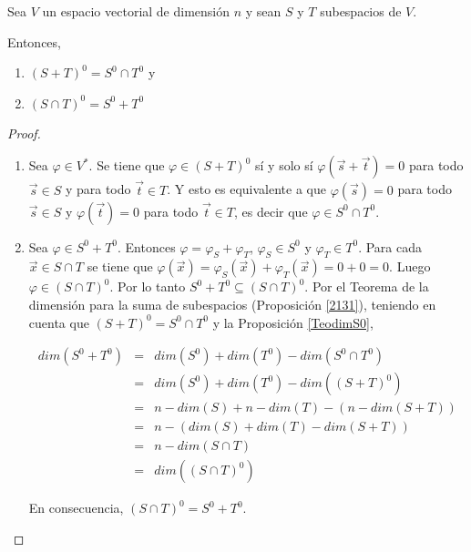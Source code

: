 \bigskip

\begin{theorem} Sea $V$ un espacio vectorial de dimensión $n$ y sean $S$ y $T$  subespacios de $V$. 


Entonces, 

\bigskip

\begin{enumerate}
\item
$(S+T)^0 = S^{0}\cap T^{0}$  y 

\item

$(S\cap T)^{0}=S^{0} +T^{0}$ 
\end{enumerate}
\bigskip

\begin{proof}

\begin{enumerate}
\item
Sea $ \varphi \in V^*$. Se tiene que $ \varphi \in (S+T)^0$ sí y solo sí $ \varphi(\Vec{s} + \Vec{t})=0$ para todo $\Vec{s} \in S$  y   para todo $\Vec{t} \in T$. Y esto es equivalente a que  $\varphi(\Vec{s})=0$ para todo  $\Vec{s} \in S$  y $\varphi(\Vec{t})=0$  para todo $\Vec{t} \in T$, es decir que  $\varphi \in  S^{0}\cap T^{0}$.

\bigskip

\item
Sea $ \varphi \in  S^{0} +T^{0}$. Entonces $ \varphi= \varphi_S + \varphi_T$, $\varphi_S \in  S^{0} $ y $\varphi_T \in  T^{0} $. Para cada $\Vec{x} \in S\cap T $ se tiene que $ \varphi(\Vec{x})=\varphi_S (\Vec{x})+  \varphi_T(\Vec{x})=0+0=0 $. Luego $  \varphi  \in (S\cap T)^{0}$. Por lo tanto $ S^{0} +T^{0}   \subseteq (S\cap T)^{0} $. Por el Teorema de la dimensión para la suma de subespacios (Proposición \ref{2131}),  teniendo en cuenta que $(S+T)^0 = S^{0}\cap T^{0}$ y la Proposición \ref{TeodimS0},

\begin{eqnarray*}
dim(S^{0} +T^{0})&=&dim(S^{0}) + dim(T^{0}) - dim (S^{0}\cap T^{0})\\
& = & dim(S^{0}) + dim(T^{0}) - dim ((S+T)^0)\\
&=& n-dim(S) + n-dim(T)-(n-dim(S+T))\\
&=& n-(dim(S) + dim(T) - dim(S+T))\\
&=& n-dim(S\cap T)\\
&=& dim((S\cap T)^{0})
\end{eqnarray*}

\bigskip

En consecuencia, $(S\cap T)^{0}=S^{0} +T^{0}$.
\end{enumerate}
\end{proof}
\end{theorem} 


